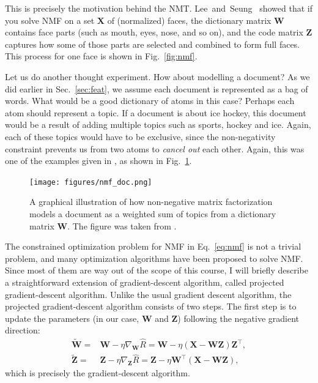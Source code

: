 \documentclass{report}
\newcommand{\matr}[1]{\mathbf{#1}}
\newcommand{\mW}[0]{\matr{W}}
\newcommand{\mZ}[0]{\matr{Z}}
\newcommand{\mX}[0]{\matr{X}}
\begin{document}
This is precisely the motivation behind the NMT.
Lee~and~Seung~\cite{lee2001algorithms} showed that if you solve NMF on a set
$\mX$ of (normalized) faces, the dictionary matrix $\mW$ contains face parts
(such as mouth, eyes, nose, and so on), and the code matrix $\mZ$ captures how
some of those parts are selected and combined to form full faces. This process
for one face is shown in Fig.~\ref{fig:nmf}.

Let us do another thought experiment. How about modelling a document? As we did
earlier in Sec.~\ref{sec:feat}, we assume each document is represented as a bag
of words. What would be a good dictionary of atoms in this case? Perhaps each
atom should represent a topic. If a document is about ice hockey, this document
would be a result of adding multiple topics such as sports, hockey and ice.
Again, each of these topics would have to be exclusive, since the non-negativity
constraint prevents us from two atoms to {\it cancel out} each other. Again,
this was one of the examples given in \cite{lee2001algorithms}, as shown in
Fig.~\ref{fig:nmf_doc}.

\begin{figure}[t]
    \centering
    \begin{minipage}{0.59\columnwidth}
        \centering
        \texttt{[image: figures/nmf\_doc.png]}
    \end{minipage}
    \begin{minipage}{0.4\columnwidth}
        \caption{
            \label{fig:nmf_doc}
            A graphical illustration of how non-negative matrix factorization
            models a document as a weighted sum of topics from a dictionary
            matrix $\mW$. The figure was taken from \cite{lee2001algorithms}.
        }
    \end{minipage}
\end{figure}

The constrained optimization problem for NMF in Eq.~\eqref{eq:nmf} is not a
trivial problem, and many optimization algorithms have been proposed to solve
NMF. Since most of them are way out of the scope of this course, I will briefly
describe a straightforward extension of gradient-descent algorithm, called
projected gradient-descent algorithm. Unlike the usual gradient descent
algorithm, the projected gradient-descent algorithm consists of two steps. The
first step is to update the parameters (in our case, $\mW$ and $\mZ$) following
the negative gradient direction:
\begin{align}
    \label{eq:nmf_dw}
    \tilde{\mW} =& \mW - \eta \nabla_{\mW} \hat{R} = \mW - \eta (\mX - \mW \mZ)
    \mZ^\top, \\
    \label{eq:nmf_dz}
    \tilde{\mZ} =& \mZ - \eta \nabla_{\mZ} \hat{R} = \mZ - \eta \mW^\top (\mX -
    \mW \mZ), 
\end{align}
which is precisely the gradient-descent algorithm. 
\end{document}
